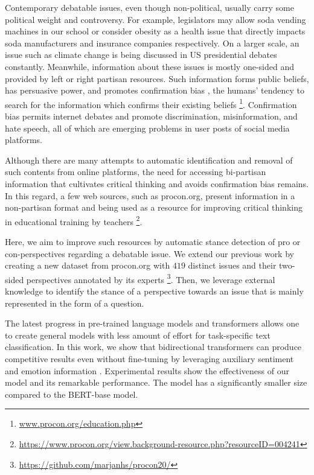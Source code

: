 \documentclass[11pt,a4paper]{article}
\begin{document}
Contemporary debatable issues, even though non-political, usually carry some political weight and controversy. For example, legislators may allow soda vending machines in our school or consider obesity as a health issue that directly impacts soda manufacturers and insurance companies respectively. On a larger scale, an issue such as climate change is being discussed in US presidential debates constantly. Meanwhile, information about these issues is mostly one-sided and provided by left or right partisan resources. Such information forms public beliefs, has persuasive power, and promotes confirmation bias \cite{StanojevicADO19}, the humans' tendency to search for the information which confirms their existing beliefs \footnote{\url{www.procon.org/education.php}}.  Confirmation bias permits internet debates and promote discrimination, misinformation, and hate speech, all of which are emerging problems in user posts of social media platforms.  
\par
Although there are many attempts to automatic identification and removal of such contents from online platforms, the need for accessing bi-partisan information that cultivates critical thinking and avoids confirmation bias remains. In this regard, a few web sources, such as procon.org, present information in a non-partisan format and being used as a resource for improving critical thinking in educational training by teachers \footnote{\url{https://www.procon.org/view.background-resource.php?resourceID=004241}}. %

Here, we aim to improve such resources by automatic stance detection of pro or con-perspectives regarding a debatable issue. We extend our previous work \cite{hosseinia2019pro} by  creating a new dataset from procon.org  with  $419$ distinct issues and their two-sided perspectives annotated by its experts \footnote{\url{https://github.com/marjanhs/procon20/}}. Then, we leverage external knowledge to identify the stance of a perspective towards an issue that is mainly represented in the form of a question. 

The latest progress in pre-trained language models \cite{howard-ruder-2018-universal} and transformers \cite{devlin-etal-2019-bert,yang2019xlnet}  
allows one to create general models with less amount of effort for task-specific text classification. In this work, we show that bidirectional transformers can produce competitive results even without fine-tuning by leveraging auxiliary sentiment and emotion information \cite{DragutYSM10}.  Experimental results show the effectiveness of our model and its remarkable performance. The model has a significantly smaller size compared to the BERT-base model. \par
\end{document}
